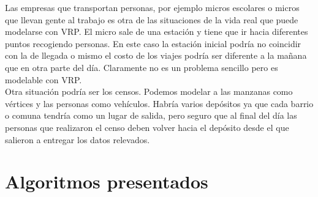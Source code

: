 \documentclass[11pt,a4paper]{article}
\begin{document}
Las empresas que transportan personas, por ejemplo micros escolares o micros que llevan gente al trabajo es otra de las situaciones de la vida real que puede modelarse con VRP. El micro sale de una estación y tiene que ir hacia diferentes puntos recogiendo personas. En este caso la estación inicial podría no coincidir con la de llegada o mismo el costo de los viajes podría ser diferente a la mañana que en otra parte del día. Claramente no es un problema sencillo pero es modelable con VRP.
\\

Otra situación podría ser los censos. Podemos modelar a las manzanas como vértices y las personas como vehículos. Habría varios depósitos ya que cada barrio o comuna tendría como un lugar de salida, pero seguro que al final del día las personas que realizaron el censo deben volver hacia el depósito desde el que salieron a entregar los datos relevados.


\section{Algoritmos presentados}
\end{document}
